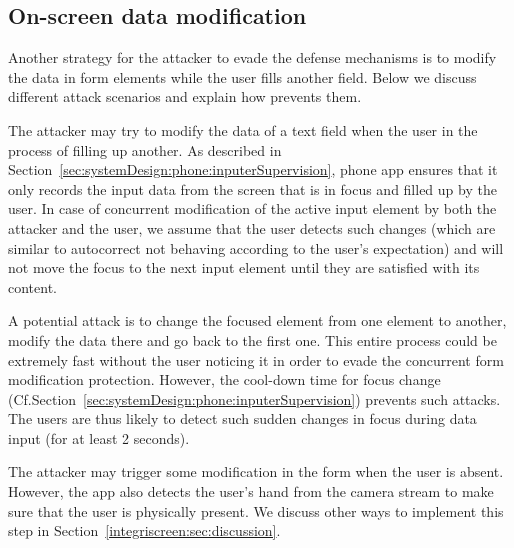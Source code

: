 \subsection{On-screen data modification}
Another strategy for the attacker to evade the defense mechanisms is to modify the data in form elements while the user fills another field. Below we discuss different attack scenarios and explain how \sysname prevents them.


 The attacker may try to modify the data of a text field when the user in the process of filling up another. As described in Section~\ref{sec:systemDesign:phone:inputerSupervision}, \sysname phone app ensures that it only records the input data from the screen that is in focus and filled up by the user. In case of concurrent modification of the active input element by both the attacker and the user, we assume that the user detects such changes (which are similar to autocorrect not behaving according to the user's expectation) and will not move the focus to the next input element until they are satisfied with its content.


 A potential attack is to change the focused element from one element to another, modify the data there and go back to the first one. This entire process could be extremely fast without the user noticing it in order to evade the concurrent form modification protection. However, the cool-down time for focus change (Cf.Section~\ref{sec:systemDesign:phone:inputerSupervision}) prevents such attacks. The users are thus likely to detect such sudden changes in focus during data input (for at least 2 seconds).

 The attacker may trigger some modification in the form when the user is absent. However, the \sysname app also detects the user's hand from the camera stream to make sure that the user is physically present. We discuss other ways to implement this step in Section~\ref{integriscreen:sec:discussion}.
